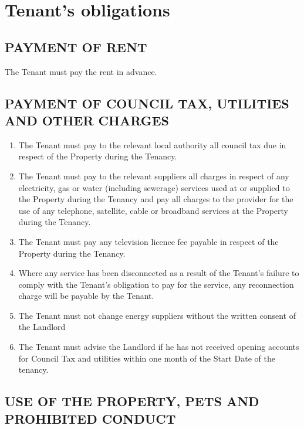 \section{Tenant's obligations}

\subsection{PAYMENT OF RENT}

The Tenant must pay the rent in advance.

\subsection{PAYMENT OF COUNCIL TAX, UTILITIES AND OTHER CHARGES}
\begin{enumerate}

\item{The Tenant must pay to the relevant local authority all council tax due in respect of the Property during the Tenancy.}

\item{The Tenant must pay to the relevant suppliers all charges in respect of any electricity, gas or water (including sewerage) services used at or supplied to the Property during the Tenancy and pay all charges to the provider for the use of any telephone, satellite, cable or broadband services at the Property during the Tenancy.}

\item{The Tenant must pay any television licence fee payable in respect of the Property during the Tenancy.}

\item{Where any service has been disconnected as a result of the Tenant's failure to comply with the Tenant's obligation to pay for the service, any reconnection charge will be payable by the Tenant.}

\item{The Tenant must not change energy suppliers without the written consent of the Landlord}

\item{The Tenant must advise the Landlord if he has not received opening accounts for Council Tax and utilities within one month of the Start Date of the tenancy.}

\end{enumerate}

\subsection{USE OF THE PROPERTY, PETS AND PROHIBITED CONDUCT}

